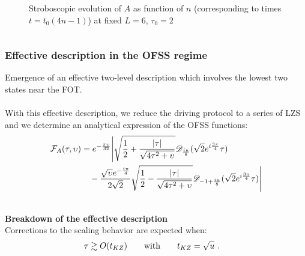 \begin{frame}
\begin{columns}
\begin{column}{0.5\textwidth}
\begin{figure}[t]
                \caption{Stroboscopic evolution of $A$  as function of  $n$ (corresponding to times $t=t_0(4n-1)$) at fixed $L=6$, $\tau_0=2$}\label{fig:strobo}
            \end{figure}
        \end{column}
        \end{columns}
\end{frame}


\begin{frame}
    \frametitle{ Effective description in the OFSS regime}

    Emergence of an effective two-level description which involves the lowest two states near the FOT. \\
    $ $\\
    With this effective description, we reduce the driving protocol to a series of LZS and we determine an analytical expression of the OFSS functions:
    \begin{align}
        {\cal F}_A(\tau,\upsilon)
        \nonumber
        &=e^{-\frac{\pi\upsilon}{32}}\Bigg|\sqrt{\frac{1}{2}+ \frac{|\tau|}{\sqrt{4\tau^2+\upsilon}}} \mathscr{D}_{\frac{i u}{8}}(\sqrt{2}e^{i\frac{3\pi}{4}}\tau) 
        \nonumber\\
        &\quad -\frac{\sqrt{\upsilon} e^{-\frac{i\pi}{4}}}{2\sqrt{2}} \sqrt{\frac{1}{2}- \frac{|\tau|}{\sqrt{4\tau^2+\upsilon}}} \mathscr{D}_{-1+\frac{i u}{8}}(\sqrt{2}e^{i\frac{3\pi}{4}}\tau)\Bigg|
    \end{align}

    $ $\\
    {\bf Breakdown of the effective description}\\

    Corrections to the scaling behavior are expected when:
    \begin{align}
        \tau   \gtrsim O(t_{KZ}) 
        \qquad {\rm with} \qquad
        t_{KZ} & = \sqrt{u} \,\,.
    \end{align}

\end{frame}